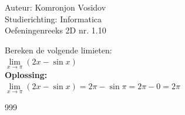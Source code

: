 \documentclass[a4paper]{article}
\begin{document}
	
	\noindent \large Auteur: Komronjon Vosidov \\
	\noindent \large Studierichting: Informatica\\
	\noindent \large Oefeningenreeks 2D nr. 1.10\\
	
	
	\medskip
	\normalsize
	
	Bereken de volgende limieten: \\
	
	$ \lim\limits_{x \to \pi} (2x-\sin x) $ \\
	
	\textbf{Oplossing:}\\
	

	$ \lim\limits_{x \to \pi} (2x - \sin x) = 2 \pi-\sin \pi=2\pi-0=2\pi$\\

	
	
	\begin{thebibliography}{999}
	\end{thebibliography}	
\end{document}
